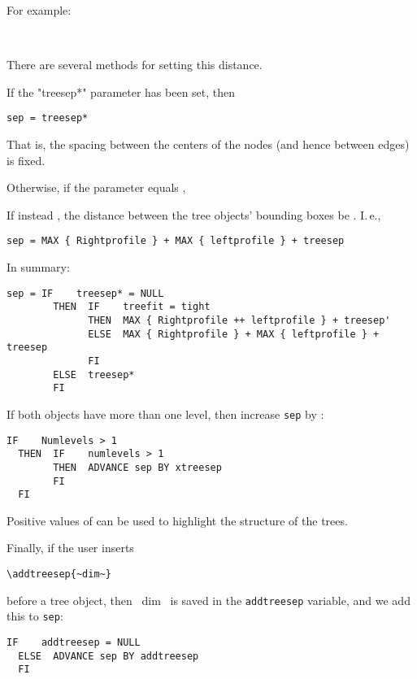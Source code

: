 \documentclass[11pt,english,BCOR10mm,DIV12,bibliography=totoc,parskip=false,smallheadings
    headexclude,footexclude,oneside]{pst-doc}
\begin{document}
For example:
\begin{LTXexample}[width=5cm,pos=l]
  \psTree[treemode=R,treeflip=true,nodesep=3pt]
    \Tc{3pt} \\
      
  \endpsTree
\end{LTXexample}

There are several methods for setting this distance.

 If the "treesep*" parameter has been set, then
\begin{lstlisting}[style=syntax]
  sep = treesep*
\end{lstlisting}
That is, the spacing between the centers of the nodes (and hence between edges) is fixed.

Otherwise, if the  parameter equals ,

If instead , the distance between the tree objects' bounding boxes be . I.\,e.,
\begin{lstlisting}[style=syntax]
  sep = MAX { Rightprofile } + MAX { leftprofile } + treesep
\end{lstlisting}

In summary:
\begin{lstlisting}[style=syntax]
  sep = IF    treesep* = NULL
        THEN  IF    treefit = tight
              THEN  MAX { Rightprofile ++ leftprofile } + treesep'
              ELSE  MAX { Rightprofile } + MAX { leftprofile } + treesep
              FI
        ELSE  treesep*
        FI
\end{lstlisting}

If both objects have more than one level, then increase \verb=sep= by :
\begin{lstlisting}[style=syntax]
  IF    Numlevels > 1
  THEN  IF    numlevels > 1
        THEN  ADVANCE sep BY xtreesep
        FI
  FI
\end{lstlisting}
Positive values of  can be used to highlight the structure of the trees.

Finally, if the user inserts
\begin{lstlisting}[style=syntax]
  \addtreesep{~dim~}
\end{lstlisting}
before a tree object, then ~dim~ is saved in the \verb=addtreesep= variable, and we add this to \verb=sep=:
\begin{lstlisting}[style=syntax]
  IF    addtreesep = NULL
  ELSE  ADVANCE sep BY addtreesep
  FI
\end{lstlisting}
\end{document}
